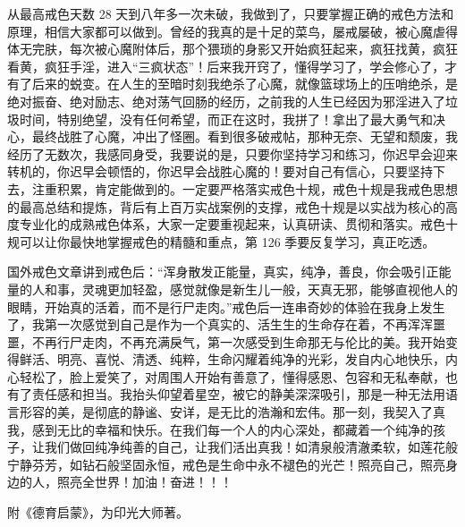 从最高戒色天数 28 天到八年多一次未破，我做到了，只要掌握正确的戒色方法和原理，相信大家都可以做到。曾经的我真的是十足的菜鸟，屡戒屡破，被心魔虐得体无完肤，每次被心魔附体后，那个猥琐的身影又开始疯狂起来，疯狂找黄，疯狂看黄，疯狂手淫，进入“三疯状态”！后来我开窍了，懂得学习了，学会修心了，才有了后来的蜕变。在人生的至暗时刻我绝杀了心魔，就像篮球场上的压哨绝杀，是绝对振奋、绝对励志、绝对荡气回肠的经历，之前我的人生已经因为邪淫进入了垃圾时间，特别绝望，没有任何希望，而正在这时，我拼了！拿出了最大勇气和决心，最终战胜了心魔，冲出了怪圈。看到很多破戒帖，那种无奈、无望和颓废，我经历了无数次，我感同身受，我要说的是，只要你坚持学习和练习，你迟早会迎来转机的，你迟早会顿悟的，你迟早会战胜心魔的！要对自己有信心，只要坚持下去，注重积累，肯定能做到的。一定要严格落实戒色十规，戒色十规是我戒色思想的最高总结和提炼，背后有上百万实战案例的支撑，戒色十规是以实战为核心的高度专业化的成熟戒色体系，大家一定要重视起来，认真研读、贯彻和落实。戒色十规可以让你最快地掌握戒色的精髓和重点，第 126 季要反复学习，真正吃透。

国外戒色文章讲到戒色后：“浑身散发正能量，真实，纯净，善良，你会吸引正能量的人和事，灵魂更加轻盈，感觉就像是新生儿一般，天真无邪，能够直视他人的眼睛，开始真的活着，而不是行尸走肉。”戒色后一连串奇妙的体验在我身上发生了，我第一次感觉到自己是作为一个真实的、活生生的生命存在着，不再浑浑噩噩，不再行尸走肉，不再充满戾气，第一次感受到生命那无与伦比的美。我开始变得鲜活、明亮、喜悦、清透、纯粹，生命闪耀着纯净的光彩，发自内心地快乐，内心轻松了，脸上爱笑了，对周围人开始有善意了，懂得感恩、包容和无私奉献，也有了责任感和担当。我抬头仰望着星空，被它的静美深深吸引，那是一种无法用语言形容的美，是彻底的静谧、安详，是无比的浩瀚和宏伟。那一刻，我契入了真我，感到无比的幸福和快乐。在我们每一个人的内心深处，都藏着一个纯净的孩子，让我们做回纯净纯善的自己，让我们活出真我！如清泉般清澈柔软，如莲花般宁静芬芳，如钻石般坚固永恒，戒色是生命中永不褪色的光芒！照亮自己，照亮身边的人，照亮全世界！加油！奋进！！！

附《德育启蒙》，为印光大师著。

